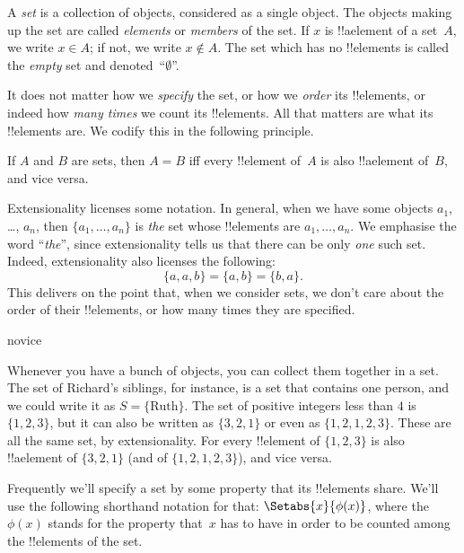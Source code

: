 \documentclass[../../../include/open-logic-section]{subfiles}
\begin{document}

A \emph{set} is a collection of objects, considered {as} a single
object. The objects making up the set are called \emph{elements} or
\emph{members} of the set. If $x$ is !!a{element} of a set~$A$, we
write $x \in A$; if not, we write $x \notin A$. The set which has no
!!{element}s is called the \emph{empty} set and
denoted~``$\emptyset$''.

\begin{explain}
It does not matter how we \emph{specify} the set, or how we
\emph{order} its !!{element}s, or indeed how \emph{many times} we
count its !!{element}s. All that matters are what its !!{element}s
are. We codify this in the following principle.
\end{explain}

\begin{defn}[Extensionality]
  If $A$ and $B$ are sets, then $A = B$ iff
  every !!{element} of~$A$ is also !!a{element} of~$B$, and vice
  versa.
\end{defn}

Extensionality licenses some notation. In general, when we have some
objects $a_{1}$, \dots, $a_{n}$, then $\{a_{1}, \dots, a_{n}\}$ is
\emph{the} set whose !!{element}s are $a_1, \ldots, a_n$. We emphasise
the word ``\emph{the}'', since extensionality tells us that there can
be only \emph{one} such set. Indeed, extensionality also licenses the
following:
  \[
    \{a, a, b\} = \{a, b\} = \{b,a\}.
  \] 
This delivers on the point that, when we consider sets, we don't care
about the order of their !!{element}s, or how many times they are
specified.

\begin{tagblock}{novice}
\begin{ex}
Whenever you have a bunch of objects, you can collect them together in
a set. The set of Richard's siblings, for instance, is a set that
contains one person, and we could write it as $S=\{\textrm{Ruth}\}$.
The set of positive integers less than $4$ is $\{1, 2, 3\}$, but it
can also be written as $\{3, 2, 1\}$ or even as $\{1, 2, 1, 2, 3\}$.
These are all the same set, by extensionality. For every !!{element}
of $\{1, 2, 3\}$ is also !!a{element} of $\{3, 2, 1\}$ (and of $\{1,
2, 1, 2, 3\}$), and vice versa.
\end{ex} 
\end{tagblock}

Frequently we'll specify a set by some property that its !!{element}s
share. We'll use the following shorthand notation for that:
$\Setabs{x}{\phi(x)}$, where the $\phi(x)$ stands for the property
that~$x$ has to have in order to be counted among the !!{element}s of
the set. 
\end{document}
